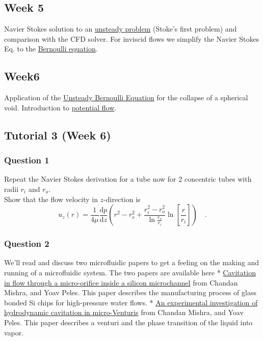 \documentclass[11pt]{article}
\begin{document}
\subsection{Week 5}\label{week-5}

Navier Stokes solution to an
\href{Analytical\%20Solution\%20to\%20an\%20unsteady\%20flow.ipynb}{unsteady
problem} (Stoke's first problem) and comparison with the CFD solver. For
inviscid flows we simplify the Navier Stokes Eq. to the
\href{Bernoulli\%20Equation.ipynb}{Bernoulli equation}.

\subsection{Week6}\label{week6}

Application of the
\href{Example\%20of\%20unsteady\%20Bernoulli\%20equation.ipynb}{Unsteady
Bernoulli Equation} for the collapse of a spherical void. Introduction
to
\href{Ideal\%20Flow\%20\&\%20Solutions\%20to\%20the\%20Laplace\%20Equation.ipynb}{potential
flow}.

\subsection{Tutorial 3 (Week 6)}\label{tutorial-3-week-6}

\subsubsection{Question 1}\label{question-1}

Repeat the Navier Stokes derivation for a tube now for 2 concentric
tubes with radii \(r_i\) and \(r_o\).\\
 Show that the flow velocity in \(z\)-direction is \[
u_z(r)=\frac{1}{4\mu}\frac{\mathrm{d}p}{\mathrm{d}z}\left(r^2-r_o^2+\frac{r_i^2-r_o^2}{\ln \frac{r_o}{r_i}}\ln\left[\frac{r}{r_i}\right]\right)\quad .
\]

\subsubsection{Question 2}\label{question-2}

We'll read and discuss two microfluidic papers to get a feeling on the
making and running of a microfluidic system. The two papers are
available here *
\href{pdf/manufacture\%20microfluidic\%20venturi.pdf}{Cavitation in flow
through a micro-orifice inside a silicon microchannel} from Chandan
Mishra, and Yoav Peles. This paper describes the manufacturing process
of glass bonded Si chips for high-pressure water flows. *
\href{pdf/microfluidic\%20venturi.pdf}{An experimental investigation of
hydrodynamic cavitation in micro-Venturis} from Chandan Mishra, and Yoav
Peles. This paper describes a venturi and the phase transition of the
liquid into vapor.
\end{document}
